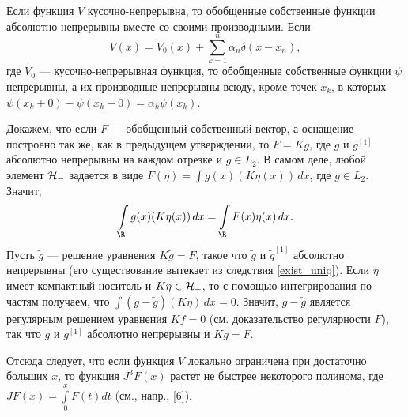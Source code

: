 \documentclass[a4paper
]{article}
\begin{document}
\begin{Cor}
Если функция $V$ кусочно-непрерывна, то обобщенные собственные функции
абсолютно непрерывны вместе со своими производными. Если $$V(x)=
V_0(x)+\sum \limits_{k=1}^n \alpha_n\delta(x-x_n),$$ где $V_0$ ---
кусочно-непрерывная функция, то обобщенные собственные функции $\psi$
непрерывны, а их производные непрерывны всюду, кроме точек $x_k$, в
которых $\psi(x_k+0)-\psi(x_k-0)=\alpha_k\psi(x_k)$.
\end{Cor}
Докажем, что если $F$ --- обобщенный собственный вектор, а оснащение
построено так же, как в предыдущем утверждении, то $F=Kg$, где $g$
и $g^{[1]}$ абсолютно непрерывны на каждом отрезке и $g\in L_2$.
В самом деле, любой элемент ${\cal H}_-$ задается в виде
$F(\eta)=\int g(x)(K\eta(x))\, dx$, где $g\in L_2$. Значит, $$\int
\limits_{\R}g(x)(K\eta(x))\, dx=\int \limits_{\R}F(x)\eta(x)\, dx.$$
Пусть $\tilde g$ --- решение уравнения $K\tilde g=F$, такое что $\tilde g$
и $\tilde g^{[1]}$ абсолютно непрерывны (его существование вытекает
из следствия \ref{exist_uniq}). Если $\eta$ имеет компактный
носитель и $K\eta\in {\cal H}_+$, то с помощью интегрирования по
частям получаем, что $\int (g-\tilde g)(K\eta)\, dx=0$. Значит,
$g-\tilde g$ является регулярным решением уравнения $Kf=0$
(см. доказательство регулярности $F$), так что $g$ и $g^{[1]}$
абсолютно непрерывны и $Kg=F$. \par
Отсюда следует, что если функция $V$ локально ограничена при достаточно
больших $x$, то функция $J^3F(x)$ растет не быстрее некоторого полинома,
где $JF(x)=\int \limits_0^x F(t)dt$ (см., напр., [6]).
\end{document}
